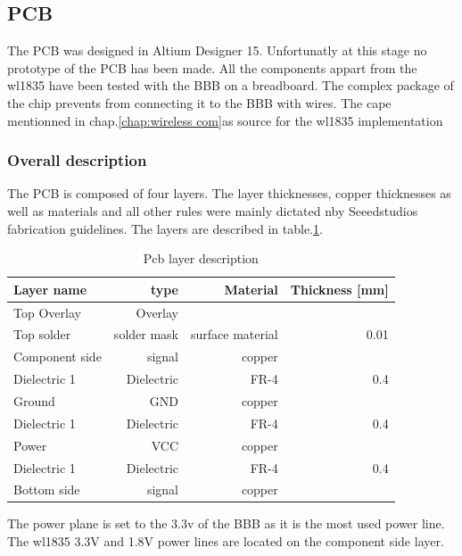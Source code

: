 \subsection{PCB}
\label{chap:pcb}
The PCB was designed in Altium Designer 15. Unfortunatly at this stage no prototype of the PCB has been made. All the components appart from the wl1835 have been tested with the BBB on a breadboard. The complex package of the chip prevents from connecting it to the BBB with wires. The cape mentionned in chap.\ref{chap:wireless com}as source for the wl1835 implementation

\subsubsection{Overall description}
The PCB is composed of four layers. The layer thicknesses, copper thicknesses as well as materials and all other rules were mainly dictated nby Seeedstudios fabrication guidelines. The layers are described in table.\ref{tab:layer description}.
\begin{table}[!htbp]
  \begin{center}
    \begin{tabular}{|l|r|r|r|}%
      \hline
        Layer name & type & Material & Thickness [mm] \\ \hline \hline
        Top Overlay & Overlay & & \\ \hline
        Top solder & solder mask & surface material & 0.01 \\ \hline
        Component side & signal & copper &  \\ \hline
        Dielectric 1 & Dielectric & FR-4 & 0.4 \\ \hline
        Ground & GND & copper &\\ \hline
        Dielectric 1 & Dielectric & FR-4 & 0.4 \\ \hline
        Power & VCC & copper & \\ \hline
        Dielectric 1 & Dielectric & FR-4 & 0.4 \\ \hline
        Bottom side & signal & copper &\\ \hline
         \hline
    \end{tabular}
  \end{center}
  \caption {Pcb layer description} \label{tab:layer description}
\end{table}

The power plane is set to the 3.3v of the BBB as it is the most used power line. The wl1835 3.3V and 1.8V power lines are located on the component side layer.

